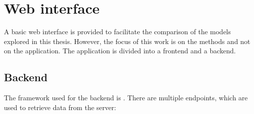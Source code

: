 \section{Web interface}\label{sec:ui}

A basic web interface is provided to facilitate the comparison of the models explored in this thesis.
However, the focus of this work is on the methods and not on the application.
The application is divided into a frontend and a backend.

\subsection{Backend}\label{subsec:backend}

The framework used for the backend is \flask{}.
There are multiple endpoints, which are used to retrieve data from the server:

